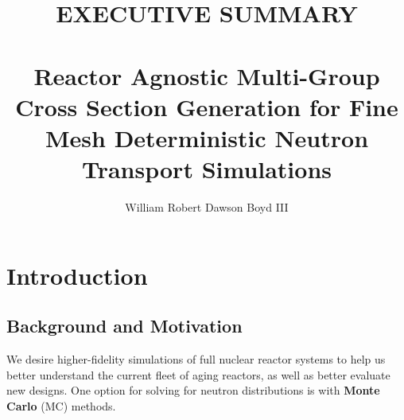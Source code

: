 \documentclass[12pt,twoside]{mitthesis-exec}
\begin{document}

\title{EXECUTIVE SUMMARY \\~\\ Reactor Agnostic Multi-Group Cross Section Generation for Fine Mesh Deterministic Neutron Transport Simulations}

\author{William Robert Dawson Boyd III}





\setcounter{savepage}{\thepage}



\singlespacing 

\section*{Introduction}

\subsection*{Background and Motivation}

We desire higher-fidelity simulations of full nuclear reactor systems to
help us better understand the current fleet of aging reactors, as well as better
evaluate new designs. One option for solving for neutron distributions is with
\textbf{Monte Carlo} (MC) methods.
\end{document}
